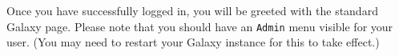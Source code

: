 \documentclass[a4paper,10pt]{article}
\begin{document}
Once you have successfully logged in, you will be greeted with the standard Galaxy page.  Please note that you should have an \texttt{\footnotesize{Admin}} menu visible for your user.  (You may need to restart your Galaxy instance for this to take effect.)\vspace{1em}\\
\setlength\fboxsep{0pt}\vspace{1em}
\end{document}
